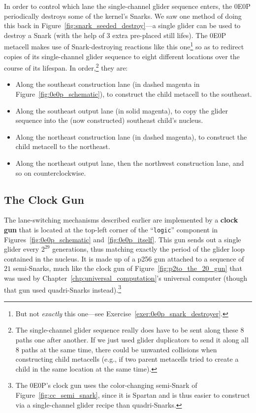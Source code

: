 In order to control which lane the single-channel glider sequence enters, the 0E0P periodically destroys some of the kernel's Snarks. We saw one method of doing this back in Figure~\ref{fig:snark_seeded_destroy}---a single glider can be used to destroy a Snark (with the help of 3 extra pre-placed still lifes). The 0E0P metacell makes use of Snark-destroying reactions like this one\footnote{But not \emph{exactly} this one---see Exercise~\ref{exer:0e0p_snark_destroyer}.} so as to redirect copies of its single-channel glider sequence to eight different locations over the course of its lifespan. In order,\footnote{The single-channel glider sequence really does have to be sent along these $8$ paths one after another. If we just used glider duplicators to send it along all $8$ paths at the same time, there could be unwanted collisions when constructing child metacells (e.g., if two parent metacells tried to create a child in the same location at the same time).} they are:\smallskip

\begin{itemize}
	\item[1)] Along the southeast construction lane (in dashed magenta in Figure~\ref{fig:0e0p_schematic}), to construct the child metacell to the southeast.\smallskip
	
	\item[2)] Along the southeast output lane (in solid magenta), to copy the glider sequence into the (now constructed) southeast child's nucleus.\smallskip
	
	\item[3)] Along the northeast construction lane (in dashed magenta), to construct the child metacell to the northeast.\smallskip
	
	\item[4) -- 8)] Along the northeast output lane, then the northwest construction lane, and so on counterclockwise.
\end{itemize}


\subsection{The Clock Gun}\label{sec:0e0p_structure_clock}

The lane-switching mechanisms described earlier are implemented by a \textbf{clock gun} that is located at the top-left corner of the ``\texttt{logic}'' component in Figures~\ref{fig:0e0p_schematic} and~\ref{fig:0e0p_itself}. This gun sends out a single glider every $2^{29}$ generations, thus matching exactly the period of the glider loop contained in the nucleus. It is made up of a p256 gun attached to a sequence of $21$ semi-Snarks, much like the clock gun of Figure~\ref{fig:p2to_the_20_gun} that was used by Chapter~\ref{chp:universal_computation}'s universal computer (though that gun used quadri-Snarks instead).\footnote{The 0E0P's clock gun uses the color-changing semi-Snark of Figure~\ref{fig:cc_semi_snark}, since it is Spartan and is thus easier to construct via a single-channel glider recipe than quadri-Snarks.}

